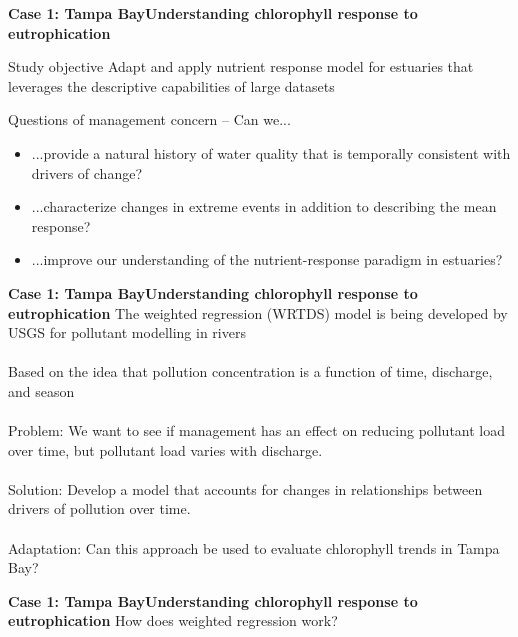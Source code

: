 \documentclass[serif]{beamer}\usepackage[]{graphicx}\usepackage[]{color}
\begin{document}
\begin{frame}{\textbf{Case 1: Tampa Bay}}{\textbf{Understanding chlorophyll response to eutrophication}}
\onslide<+->
\begin{block}{Study objective}
Adapt and apply nutrient response model for estuaries that leverages the descriptive capabilities of large datasets
\end{block}
\vspace{0.2in}
\onslide<+->
Questions of management concern -- Can we...
\begin{itemize}
\item ...provide a natural history of water quality that is temporally consistent with drivers of change?
\onslide<+->
\item ...characterize changes in extreme events in addition to describing the mean response?  
\onslide<+->
\item ...improve our understanding of the nutrient-response paradigm in estuaries?
\end{itemize}
\end{frame}

\begin{frame}{\textbf{Case 1: Tampa Bay}}{\textbf{Understanding chlorophyll response to eutrophication}}
\onslide<+->
The \alert{weighted regression (WRTDS)} model is being developed by USGS for pollutant modelling in rivers \cite{Hirsch10}\\~\\
Based on the idea that pollution concentration is a function of \alert{time}, \alert{discharge}, and \alert{season}\\~\\
\onslide<+->
\alert{Problem:} We want to see if management has an effect on reducing pollutant load over time, but pollutant load varies with discharge.\\~\\
\alert{Solution:} Develop a model that accounts for changes in relationships between drivers of pollution over time.\\~\\
\alert{Adaptation:} Can this approach be used to evaluate chlorophyll trends in Tampa Bay?
\end{frame}



\begin{frame}{\textbf{Case 1: Tampa Bay}}{\textbf{Understanding chlorophyll response to eutrophication}}
How does weighted regression work?
\begin{center}
\end{center}
\end{frame}
\end{document}
